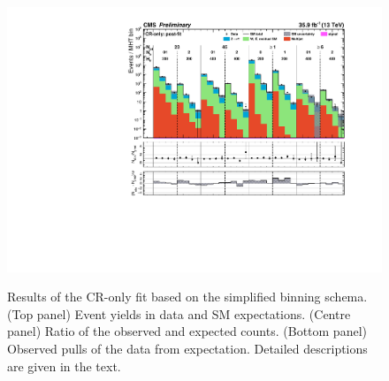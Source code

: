 \begin{figure}[h!]
  \centering
  \caption{Results of the CR-only fit based on the simplified binning
    schema. (Top panel) Event yields in data and SM
    expectations. (Centre panel) Ratio of the observed and expected
    counts. (Bottom panel) Observed pulls of the data from
    expectation. Detailed descriptions are given in the text.
  }
  \includegraphics[width=0.95\linewidth]{figures/results/36invfb_approval/aggregated/aggregate_cr-only.pdf} 
  \label{fig:aggregated_results}
\end{figure}

